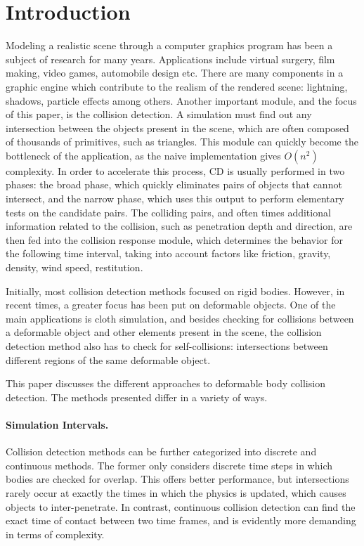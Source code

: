 \section{Introduction}
\label{section:intro}

Modeling a realistic scene through a computer graphics program has been a subject of research for many years. Applications include virtual surgery, film making, video games, automobile design etc. There are many components in a graphic engine which contribute to the realism of the rendered scene: lightning, shadows, particle effects among others. Another important module, and the focus of this paper, is the collision detection. A simulation must find out any intersection between the objects present in the scene, which are often composed of thousands of primitives, such as triangles. This module can quickly become the bottleneck of the application, as the naive implementation gives $O(n^{2})$ complexity. In order to accelerate this process, CD is usually performed in two phases: the broad phase, which quickly eliminates pairs of objects that cannot intersect, and the narrow phase, which uses this output to perform elementary tests on the candidate pairs. The colliding pairs, and often times additional information related to the collision, such as penetration depth and direction, are then fed into the collision response module, which determines the behavior for the following time interval, taking into account factors like friction, gravity, density, wind speed, restitution.

Initially, most collision detection methods focused on rigid bodies. However, in recent times, a greater focus has been put on deformable objects. One of the main applications is cloth simulation, and besides checking for collisions between a deformable object and other elements present in the scene, the collision detection method also has to check for self-collisions: intersections between different regions of the same deformable object.

This paper discusses the different approaches to deformable body collision detection. The methods presented differ in a variety of ways.

\paragraph{Simulation Intervals.}

Collision detection methods can be further categorized into discrete and continuous methods. The former only considers discrete time steps in which bodies are checked for overlap. This offers better performance, but intersections rarely occur at exactly the times in which the physics is updated, which causes objects to inter-penetrate. In contrast, continuous collision detection can find the exact time of contact between two time frames, and is evidently more demanding in terms of complexity.

